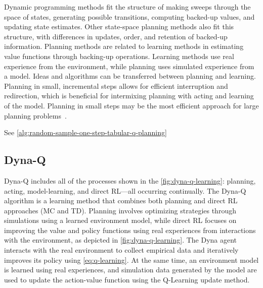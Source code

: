 \documentclass[../xlapes02]{subfiles}
\begin{document}
    \begin{center}
    \end{center}

    Dynamic programming methods fit the structure of making sweeps through the space of states, generating possible transitions, computing backed-up values, and updating state estimates. Other state-space planning methods also fit this structure, with differences in updates, order, and retention of backed-up information. Planning methods are related to learning methods in estimating value functions through backing-up operations. Learning methods use real experience from the environment, while planning uses simulated experience from a model. Ideas and algorithms can be transferred between planning and learning. Planning in small, incremental steps allows for efficient interruption and redirection, which is beneficial for intermixing planning with acting and learning of the model. Planning in small steps may be the most efficient approach for large planning problems~\cite{sutton2018reinforcement}.

    See \cref{alg:random-sample-one-step-tabular-q-planning}

    \subsection{Dyna-Q}\label{sec:dyna-q}
    Dyna-Q includes all of the processes shown in the \cref{fig:dyna-q-learning}: planning, acting, model-learning, and direct RL—all occurring continually. The Dyna-Q algorithm is a learning method that combines both planning and direct RL approaches (MC and TD). Planning involves optimizing strategies through simulations using a learned environment model, while direct RL focuses on improving the value and policy functions using real experiences from interactions with the environment, as depicted in \cref{fig:dyna-q-learning}. The Dyna agent interacts with the real environment to collect empirical data and iteratively improves its policy using \cref{eq:q-learning}. At the same time, an environment model is learned using real experiences, and simulation data generated by the model are used to update the action-value function using the Q-Learning update method.
\end{document}
